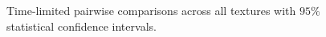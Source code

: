 \begin{figure}[t]
	\centering
	\caption[Time-limited pairwise comparisons across all textures.]{Time-limited pairwise comparisons across all textures with $95\%$ statistical confidence intervals.}
	\label{fig:pairwise_alltextures}
\end{figure}

